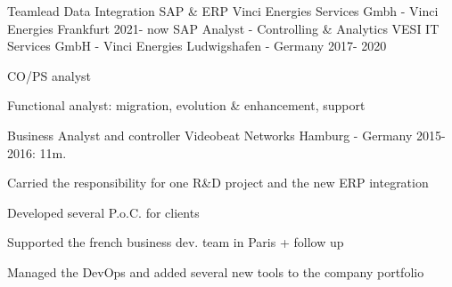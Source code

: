 

\begin{cventries}
        \cventry
                {Teamlead Data Integration SAP \& ERP} %
                {Vinci Energies Services Gmbh - Vinci Energies} %
                {Frankfurt} %
                {2021- now} %
                {
                }
\cventry
	{SAP Analyst - Controlling \& Analytics} %
	{VESI IT Services GmbH - Vinci Energies} %
	{Ludwigshafen - Germany} %
	{2017- 2020} %
	{
		\begin{cvitems} %
			\item {CO/PS analyst}
			\item {Functional analyst: migration, evolution \& enhancement, support}
		\end{cvitems}
	}

  \cventry
    {Business Analyst and controller} %
    {Videobeat Networks} %
    {Hamburg - Germany} %
    {2015-2016: 11m.} %
    {
      \begin{cvitems} %
        \item {Carried the responsibility for one R\&D project and the new ERP integration}
        \item {Developed several P.o.C. for clients}
        \item {Supported the french business dev. team in Paris + follow up}
        \item {Managed the DevOps and added several new tools to the company portfolio}
      \end{cvitems}
    }


\end{cventries}

